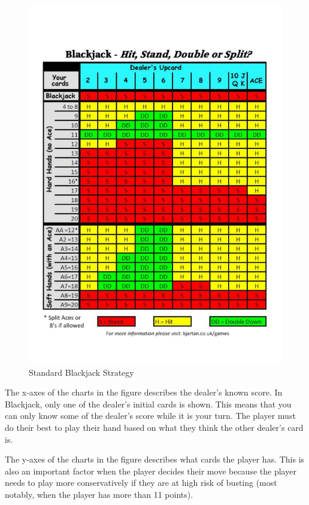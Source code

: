 \documentclass{article}
\begin{document}
		\begin{figure}
			\begin{center}
				\hypertarget{fig1}{}
				\includegraphics[width=12cm]{blackjack-chart.png}
				\vspace*{-12mm}
				\caption{Standard Blackjack Strategy}
			\end{center}
		\end{figure}


		The x-axes of the charts in the figure describes the dealer's known score. In Blackjack, only one of the dealer's
		initial cards is shown. This means that you can only know some of the dealer's score while it is your turn.
		The player must do their best to play their hand based on what they think the other dealer's card is.
		
		The y-axes of the charts in the figure describes what cards the player has. This is also an important factor
		when the player decides their move because the player needs to play more conservatively if they are at high
		risk of busting (most notably, when the player has more than 11 points).
		
\end{document}
